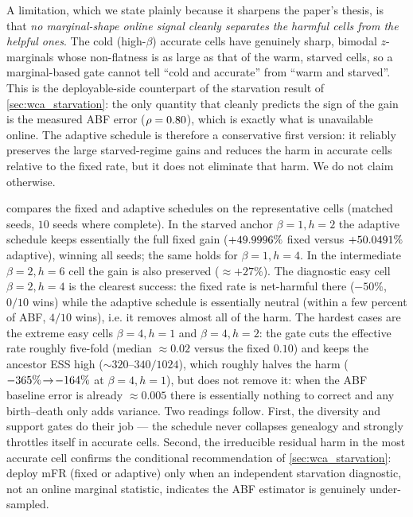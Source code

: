 A limitation, which we state plainly because it sharpens the paper's thesis, is
that \emph{no marginal-shape online signal cleanly separates the harmful cells from
the helpful ones}. The cold (high-$\beta$) accurate cells have genuinely sharp,
bimodal $z$-marginals whose non-flatness is as large as that of the warm, starved
cells, so a marginal-based gate cannot tell ``cold and accurate'' from ``warm and
starved''. This is the deployable-side counterpart of the starvation result of
\cref{sec:wca_starvation}: the only quantity that cleanly predicts the sign of the
gain is the measured ABF error ($\rho=0.80$), which is exactly what is
unavailable online. The adaptive schedule is therefore a conservative first
version: it reliably preserves the large starved-regime gains and reduces the
harm in accurate cells relative to the fixed rate, but it does not eliminate that
harm. We do not claim otherwise.

 compares the fixed and adaptive schedules on the
representative cells (matched seeds, $10$ seeds where complete). In the starved
anchor $\beta=1,h=2$ the adaptive schedule keeps essentially the full fixed gain
($+49.9996\%$ fixed versus $+50.0491\%$
adaptive), winning all seeds; the same holds for $\beta=1,h=4$. In the
intermediate $\beta=2,h=6$ cell the gain is also preserved ($\approx+27\%$). The
diagnostic easy cell $\beta=2,h=4$ is the clearest success: the fixed rate is
net-harmful there ($-50\%$, $0/10$ wins) while the adaptive schedule is essentially
neutral (within a few percent of ABF, $4/10$ wins), i.e. it removes almost all of
the harm. The hardest cases are the extreme easy cells $\beta=4,h=1$ and
$\beta=4,h=2$: the gate cuts the effective rate roughly five-fold (median
$\approx0.02$ versus the fixed $0.10$) and keeps the ancestor ESS high
($\sim\!320$--$340/1024$), which roughly halves the harm
($-365\%\!\to\!-164\%$ at $\beta=4,h=1$), but
does not remove it: when the ABF baseline error is already $\approx0.005$ there is
essentially nothing to correct and any birth--death only adds variance. Two readings follow. First, the diversity
and support gates do their job --- the schedule never collapses genealogy and
strongly throttles itself in accurate cells. Second, the irreducible residual harm
in the most accurate cell confirms the conditional recommendation of
\cref{sec:wca_starvation}: deploy mFR (fixed or adaptive) only when an independent
starvation diagnostic, not an online marginal statistic, indicates the ABF
estimator is genuinely under-sampled.

